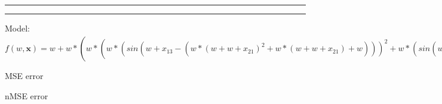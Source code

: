 \documentclass[12pt]{article}
\begin{document}
\hrule
\vspace{1cm}
\hrule
\vspace{1cm}
Model: $f(w,\mathbf{x})=w+w*(w*(w*(sin(w+x_13-(w*(w+w+x_21)^2+w*(w+w+x_21)+w)))^2+w*(sin(w+x_13-(w*(w+w+x_21)^2+w*(w+w+x_21)+w)))+w)^2+w*(w*(sin(w+x_13-(w*(w+w+x_21)^2+w*(w+w+x_21)+w)))^2+w*(sin(w+x_13-(w*(w+w+x_21)^2+w*(w+w+x_21)+w)))+w)+w)^2+w*(w*(w*(sin(w+x_13-(w*(w+w+x_21)^2+w*(w+w+x_21)+w)))^2+w*(sin(w+x_13-(w*(w+w+x_21)^2+w*(w+w+x_21)+w)))+w)^2+w*(w*(sin(w+x_13-(w*(w+w+x_21)^2+w*(w+w+x_21)+w)))^2+w*(sin(w+x_13-(w*(w+w+x_21)^2+w*(w+w+x_21)+w)))+w)+w)+w-(w*(w+w+x_14)^2+w*(w+w+x_14)+w)-(w+w*(x_41-(w*(x_42)^2+w*(x_42)+w-(w*(x_35-(x_1))^2+w*(x_35-(x_1))+w)))^2+w*(x_41-(w*(x_42)^2+w*(x_42)+w-(w*(x_35-(x_1))^2+w*(x_35-(x_1))+w)))+w)$

MSE error

nMSE error
\end{document}
